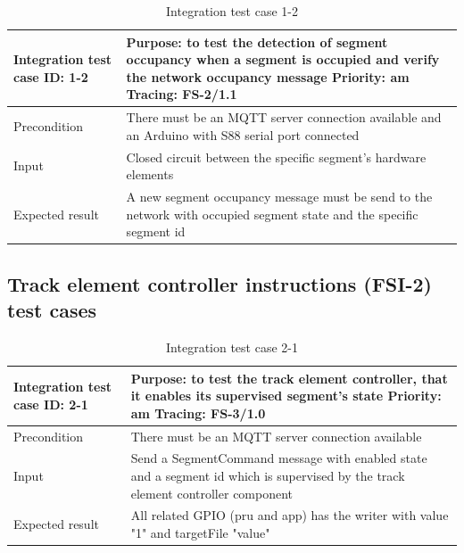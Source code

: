 \begin{table}[H]
	\caption{Integration test case 1-2}
	\label{table:TCase-FSI1-2}
	\begin{center}
		\renewcommand{\arraystretch}{1.8}
		\begin{tabu} 
			to 0.9 \textwidth
			{  X[0.3, l] X[l] }
			\toprule
			Integration test case ID: 1-2 & Purpose: to test the detection of segment occupancy when a segment is occupied and verify the network occupancy message \newline Priority: am \newline Tracing: FS-2/1.1 \\ \midrule
			Precondition                  & There must be an MQTT server connection available and an Arduino with S88 serial port connected                                                                          \\
			Input                         & Closed circuit between the specific segment's hardware elements                                                                                                          \\
			Expected result               & A new segment occupancy message must be send to the network with occupied segment state  and the specific segment id                                                     \\ \bottomrule
		\end{tabu}
	\end{center}
\end{table} 

\subsection{Track element controller instructions (FSI-2) test cases}
\begin{table}[H]
	\caption{Integration test case 2-1}
	\label{table:TCase-FSI2-1}
	\begin{center}
		\renewcommand{\arraystretch}{1.8}
		\begin{tabu} 
			to 0.9 \textwidth
			{  X[0.3, l] X[l] }
			\toprule
			Integration test case ID: 2-1 & Purpose: to test the track element controller, that it enables its supervised segment's state \newline Priority: am \newline Tracing: FS-3/1.0 \\ \midrule
			Precondition                  & There must be an MQTT server connection available                                                                                              \\
			Input                         & Send a SegmentCommand message with enabled state and a segment id which is supervised by the track element controller component                \\
			Expected result               & All related GPIO (pru and app) has the writer with value "1" and targetFile "value"                                                            \\ \bottomrule
		\end{tabu}
	\end{center}
\end{table} 

